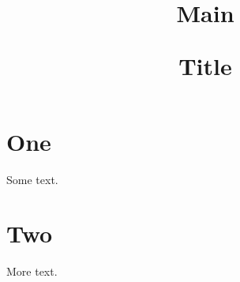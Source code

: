 \documentclass[titlepage]{report}
\title{Main\par Title}
\begin{document}
\tableofcontents
\section{One}
Some text.
\section{Two}
More text.
\end{document}
